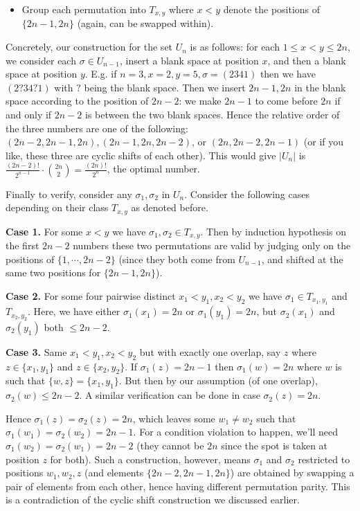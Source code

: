 \documentclass[11pt,a4paper]{article}
\begin{document}
\begin{enumerate}
\begin{itemize}
        	\item Group each permutation into $T_{x, y}$ where $x<y$ denote the positions of $\{2n-1, 2n\}$ (again, can be swapped within). 
        \end{itemize}
       
        Concretely, our construction for the set $U_n$ is as follows: for each $1\le x < y\le 2n$, we consider each $\sigma\in U_{n-1}$, insert a blank space at position $x$, and then a blank space at position $y$. E.g. if $n=3, x=2, y=5, \sigma=(2341)$ then we have $(2?34?1)$ with $?$ being the blank space. 
        Then we insert $2n-1, 2n$ in the blank space according to the position of $2n-2$: we make $2n-1$ to come before $2n$ if and only if $2n-2$ is between the two blank spaces. 
        Hence the relative order of the three numbers are one of the following: $(2n-2, 2n-1, 2n), (2n-1, 2n, 2n-2)$, or $(2n, 2n-2, 2n-1)$ (or if you like, these three are cyclic shifts of each other). 
        This would give $|U_n|$ is $\frac{(2n-2)!}{2^{n-1}}\cdot \binom{2n}{2} = \frac{(2n)!}{2^n}$, 
        the optimal number. 
        
        Finally to verify, consider any $\sigma_1, \sigma_2$ in $U_n$. Consider the following cases depending on their class $T_{x, y}$ as denoted before. 
        
        \textbf{Case 1.} For some $x < y$ we have $\sigma_1, \sigma_2\in T_{x, y}$. 
        Then by induction hypothesis on the first $2n-2$ numbers these two permutations are valid by judging only on the positions of $\{1, \cdots, 2n-2\}$ (since they both come from $U_{n-1}$, and shifted at the same two positions for $\{2n-1, 2n\}$). 
        
        \textbf{Case 2.} For some four pairwise distinct $x_1<y_1, x_2<y_2$ we have $\sigma_1\in T_{x_1, y_1}$ and $T_{x_2, y_2}$. 
        Here, we have either $\sigma_1(x_1)=2n$ or $\sigma_1(y_1)=2n$, but $\sigma_2(x_1)$ and $\sigma_2(y_1)$ both $\le 2n-2$. 
        
        \textbf{Case 3.} Same $x_1 < y_1, x_2 < y_2$ but with exactly one overlap, say $z$ where $z\in \{x_1, y_1\}$ and $z\in \{x_2, y_2\}$. 
        If $\sigma_1(z)=2n-1$ then $\sigma_1(w)=2n$ where $w$ is such that $\{w, z\}=\{x_1, y_1\}$. 
        But then by our assumption (of one overlap), $\sigma_2(w)\le 2n-2$. 
        A similar verification can be done in case $\sigma_2(z)=2n$. 
        
        Hence $\sigma_1(z)=\sigma_2(z)=2n$, which leaves some $w_1\neq w_2$ such that $\sigma_1(w_1)=\sigma_2(w_2)=2n-1$. For a condition violation to happen, 
        we'll need $\sigma_1(w_2)=\sigma_2(w_1)=2n-2$ (they cannot be $2n$ since the spot is taken at position $z$ for both). 
        Such a construction, however, means $\sigma_1$ and $\sigma_2$ restricted to positions $w_1, w_2, z$ (and elements $\{2n-2, 2n-1, 2n\}$) are obtained by swapping a pair of elements from each other, 
        hence having different permutation parity. 
        This is a contradiction of the cyclic shift construction we discussed earlier. 
	\end{enumerate}
	
\end{document}
